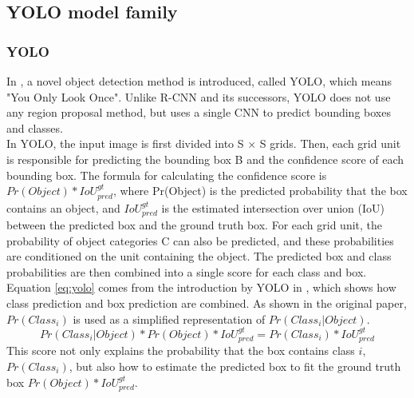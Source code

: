 \subsection{YOLO model family}
\subsubsection{YOLO}
In \cite{DBLP:journals/corr/RedmonDGF15}, a novel object detection method is introduced, called YOLO, which means "You Only Look Once". Unlike R-CNN and its successors, YOLO does not use any region proposal method, but uses a single CNN to predict bounding boxes and classes. 
\\In YOLO, the input image is first divided into S × S grids. Then, each grid unit is responsible for predicting the bounding box B and the confidence score of each bounding box. The formula for calculating the confidence score is \(Pr(Object)*IoU_{pred}^{gt}\), where Pr(Object) is the predicted probability that the box contains an object, and \(IoU_{pred}^{gt}\) is the estimated intersection over union (IoU) between the predicted box and the ground truth box. For each grid unit, the probability of object categories C can also be predicted, and these probabilities are conditioned on the unit containing the object. The predicted box and class probabilities are then combined into a single score for each class and box. 
\\Equation \ref{eq:yolo} comes from the introduction by YOLO in \cite{DBLP:journals/corr/RedmonDGF15}, which shows how class prediction and box prediction are combined. As shown in the original paper, \(Pr(Class_i)\) is used as a simplified representation of \(Pr(Class_i|Object)\).
\begin{equation}
	\label{eq:yolo}
	Pr(Class_i|Object)*Pr(Object)*IoU^{gt}_{pred} = Pr(Class_i)*IoU^{gt}_{pred}
\end{equation}
This score not only explains the probability that the box contains class \(i\), \(Pr(Class_i)\), but also how to estimate the predicted box to fit the ground truth box \(Pr(Object)*IoU_{pred}^{gt}\). 

